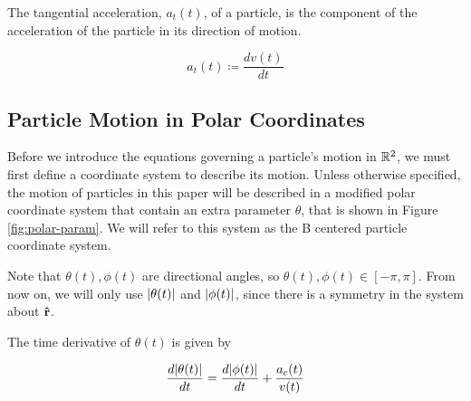 \begin{definition}
  The tangential acceleration, $a_t(t)$, of a particle, is the component of the acceleration of the particle in its direction of motion.

  \[a_t(t) \coloneqq \frac{dv(t)}{dt}\]
\end{definition}


\subsection{Particle Motion in Polar Coordinates}

Before we introduce the equations governing a particle's motion in $\mathbb R^2$, we must first define a coordinate system to describe its motion. Unless otherwise specified, the motion of particles in this paper will be described in a modified polar coordinate system that contain an extra parameter $\theta$, that is shown in Figure \ref{fig:polar-param}. We will refer to this system as the B centered particle coordinate system.


Note that $\theta(t), \phi(t)$ are directional angles, so $\theta(t), \phi(t) \in [-\pi, \pi]$. From now on, we will only use $\abs{\theta(t)}$ and $\abs{\phi(t)}$, since there is a symmetry in the system about $\mathbf{\hat{r}}$.

\begin{lemma}
The time derivative of $\theta(t)$ is given by

\begin{equation}\label{eq:theta-deriv}
\frac{d\abs{\theta(t)}}{dt} = \frac{d\abs{\phi(t)}}{dt} + \frac{a_c(t)}{v(t)}
\end{equation}

\end{lemma}

